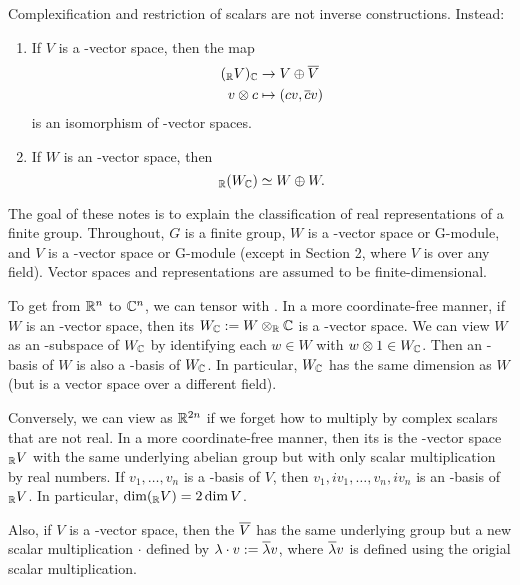 \documentclass{scrartcl}
\begin{document}
Complexification and restriction of scalars are not inverse constructions. Instead:
\begin{proposition}
    \hfill
    \begin{enumerate}[font=\normalfont]
        \item If $V$ is a \CC-vector space, then the map \begin{align*}
            (_{\mathbb R} V)_{\mathbb C} &\rightarrow V \oplus \overline{V} \\
            v\otimes c &\mapsto (cv,\overline{c}v) \\
        \end{align*} is an isomorphism of \CC-vector spaces.
        \item If $W$ is an \RR-vector space, then \[_{\mathbb R}(W_{\mathbb C}) \simeq W\oplus W.\]
    \end{enumerate}
\end{proposition}


The goal of these notes is to explain the classification of real representations of a finite
group. Throughout, $G$ is a finite group, $W$ is a \RR-vector space or \RR G-module, and $V$ is a
\CC-vector space or \CC G-module (except in Section 2, where $V$ is over any field). Vector spaces
and representations are assumed to be finite-dimensional.

To get from $\mathbb R^n$ to $\mathbb C^n$, we can tensor with \CC. In a more coordinate-free
manner, if $W$ is an \RR-vector space, then its  $W_{\mathbb C} := W \otimes_{\mathbb R} \mathbb C$ is a \CC-vector
space. We can view $W$ as an \RR-subspace of $W_{\mathbb C}$ by identifying each $w \in W$ with $w \otimes 1 \in W_{\mathbb C}$.
Then an \RR-basis of $W$ is also a \CC-basis of $W_{\mathbb C}$. In particular, $W_{\mathbb C}$ has the same dimension as
$W$ (but is a vector space over a different field).

Conversely, we can view \CCn as $\mathbb R^{2n}$ if we forget how to multiply by complex scalars that are not real. In a more coordinate-free manner, then its  is the \RR-vector space $_{\mathbb R} V$ with the same underlying abelian group but with only scalar multiplication by real numbers. If $v_1,\dots,v_n$ is a \CC-basis of $V$, then $v_1, iv_1,\dots,v_n,iv_n$ is an \RR-basis of $_{\mathbb R} V$. In particular, $\dim(_{\mathbb R} V) = 2\dim V$.

Also, if $V$ is a \CC-vector space, then the  $\overline{V}$ has the same underlying group but a new scalar multiplication $\cdot$ defined by $\lambda\cdot v := \overline{\lambda}v$, where $\overline{\lambda}v$ is defined using the origial scalar multiplication.
\end{document}
